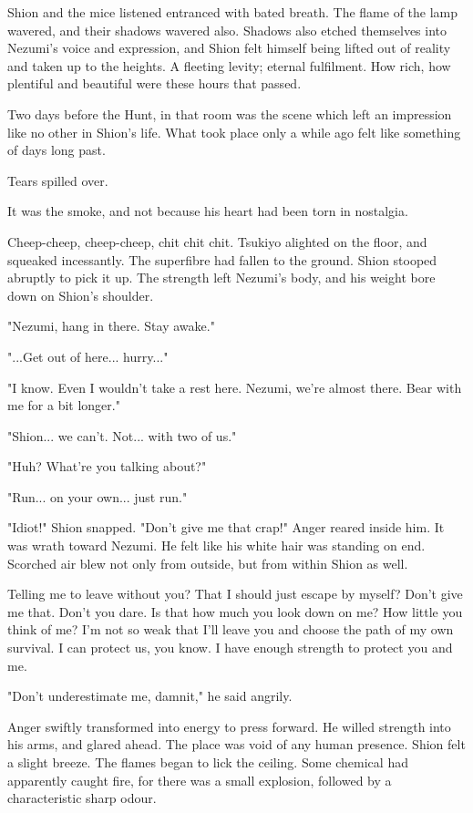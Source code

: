 Shion and the mice listened entranced with bated breath. The flame of
the lamp wavered, and their shadows wavered also. Shadows also etched
themselves into Nezumi's voice and expression, and Shion felt himself
being lifted out of reality and taken up to the heights. A fleeting
levity; eternal fulfilment. How rich, how plentiful and beautiful were
these hours that passed.

Two days before the Hunt, in that room was the scene which left an
impression like no other in Shion's life. What took place only a while
ago felt like something of days long past.

Tears spilled over.

It was the smoke, and not because his heart had been torn in nostalgia.

Cheep-cheep, cheep-cheep, chit chit chit. Tsukiyo alighted on the floor,
and squeaked incessantly. The superfibre had fallen to the ground. Shion
stooped abruptly to pick it up. The strength left Nezumi's body, and his
weight bore down on Shion's shoulder.

"Nezumi, hang in there. Stay awake."

"...Get out of here... hurry..."

"I know. Even I wouldn't take a rest here. Nezumi, we're almost there.
Bear with me for a bit longer."

"Shion... we can't. Not... with two of us."

"Huh? What're you talking about?"

"Run... on your own... just run."

"Idiot!" Shion snapped. "Don't give me that crap!" Anger reared inside
him. It was wrath toward Nezumi. He felt like his white hair was
standing on end. Scorched air blew not only from outside, but from
within Shion as well.

Telling me to leave without you? That I should just escape by myself?
Don't give me that. Don't you dare. Is that how much you look down on
me? How little you think of me? I'm not so weak that I'll leave you and
choose the path of my own survival. I can protect us, you know. I have
enough strength to protect you and me.

"Don't underestimate me, damnit," he said angrily.

Anger swiftly transformed into energy to press forward. He willed
strength into his arms, and glared ahead. The place was void of any
human presence. Shion felt a slight breeze. The flames began to lick the
ceiling. Some chemical had apparently caught fire, for there was a small
explosion, followed by a characteristic sharp odour.


